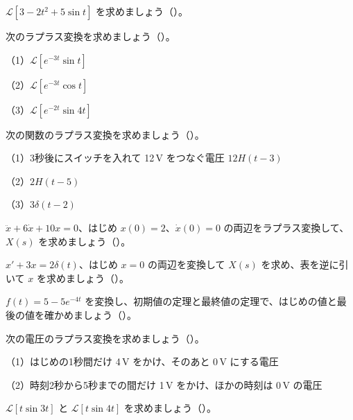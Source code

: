 \bkproblem $\mathcal L[3-2t^2+5\sin t]$ を求めましょう\mbox{（）}。

\bkproblem 次のラプラス変換を求めましょう\mbox{（）}。\par
（1）\nobreak $\mathcal L[e^{-3t}\sin t]$\par
（2）\nobreak $\mathcal L[e^{-3t}\cos t]$\par
（3）\nobreak $\mathcal L[e^{-2t}\sin4t]$

\bkproblem 次の関数のラプラス変換を求めましょう\mbox{（）}。\par
（1）\nobreak 3秒後にスイッチを入れて 12\,V をつなぐ電圧 $12H(t-3)$\par
（2）\nobreak $2H(t-5)$\par
（3）\nobreak $3\delta(t-2)$

\bkproblem $\ddot x+6\dot x+10x=0$、はじめ $x(0)=2$、$\dot x(0)=0$ の両辺をラプラス変換して、$X(s)$ を求めましょう\mbox{（）}。

\bkproblem $x'+3x=2\delta(t)$、はじめ $x=0$ の両辺を変換して $X(s)$ を求め、表を逆に引いて $x$ を求めましょう\mbox{（）}。

\bkproblem $f(t)=5-5e^{-4t}$ を変換し、初期値の定理と最終値の定理で、はじめの値と最後の値を確かめましょう\mbox{（）}。


\bkproblem 次の電圧のラプラス変換を求めましょう\mbox{（）}。\par
（1）\nobreak はじめの1秒間だけ 4\,V をかけ、そのあと 0\,V にする電圧\par
（2）\nobreak 時刻2秒から5秒までの間だけ 1\,V をかけ、ほかの時刻は 0\,V の電圧

\bkproblem $\mathcal L[t\sin3t]$ と $\mathcal L[t\sin4t]$ を求めましょう\mbox{（）}。

